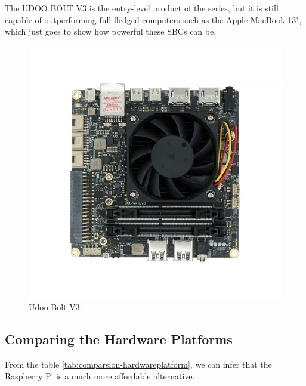 The UDOO BOLT V3 is the entry-level product of the series, but it is still capable of outperforming full-fledged computers such as the Apple MacBook 13", which just goes to show how powerful these \acs{SBC}s can be.

\begin{figure}[H]
    \centering
    \includegraphics[width=0.5\linewidth]{images/udoobolt-image.jpg}
    \caption{Udoo Bolt V3.}
    \label{fig:udoobolt-image}
\end{figure}

\subsection{Comparing the Hardware Platforms}

From the table \ref{tab:comparsion-hardwareplatform}, we can infer that the Raspberry Pi is a much more affordable alternative.

